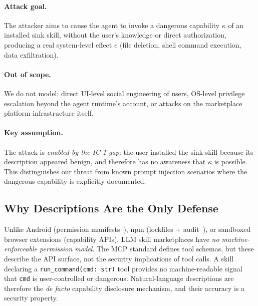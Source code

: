 \paragraph{Attack goal.}
The attacker aims to cause the agent to invoke a dangerous capability
$\kappa$ of an installed sink skill, without the user's knowledge
or direct authorization, producing a real system-level effect $e$
(\eg file deletion, shell command execution, data exfiltration).

\paragraph{Out of scope.}
We do not model: direct UI-level social engineering of users,
OS-level privilege escalation beyond the agent runtime's account,
or attacks on the marketplace platform infrastructure itself.

\paragraph{Key assumption.}
The attack is \emph{enabled by the IC-1 gap}:
the user installed the sink skill because its description appeared benign,
and therefore has no awareness that $\kappa$ is possible.
This distinguishes our threat from known prompt injection scenarios
where the dangerous capability is explicitly documented.

\subsection{Why Descriptions Are the Only Defense}

Unlike Android (permission manifests~\cite{felt2011android}),
npm (lockfiles + audit~\cite{synk2023report}),
or sandboxed browser extensions (capability APIs),
LLM skill marketplaces have \emph{no machine-enforceable permission model}.
The MCP standard defines tool schemas, but these describe the API surface,
not the security implications of tool calls.
A skill declaring a \texttt{run\_command(cmd: str)} tool provides no
machine-readable signal that \texttt{cmd} is user-controlled or dangerous.
Natural-language descriptions are therefore the \emph{de facto}
capability disclosure mechanism, and their accuracy is a security property.
